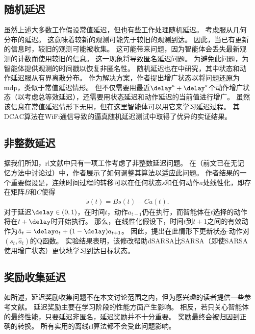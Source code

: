 \subsection{随机延迟}
\label{subsec:stochastic_related}
虽然上述大多数工作假设常值延迟，但也有些工作处理随机延迟。
\cite{agarwal2021blind}考虑服从几何分布的延迟。
这意味着较新的观测可能先于较旧的观测到达。
因此，当已有更新的信息时，较旧的观测可能被收集。
这可能带来问题，因为智能体会丢失最新观测的计数而使用较旧的信息。
这一现象将导致匿名延迟问题。
为避免此问题，\cite{agarwal2021blind}为智能体提供观测的时间戳以恢复非匿名性。
随机延迟也在\cite{bouteiller2020reinforcement}中研究，其中状态和动作延迟服从有界离散分布。
作为解决方案，作者提出增广状态以将问题还原为\gls{mdp}，类似于常值延迟情形。
但不仅需要用最近$\delay^a+\delay^s$个动作增广状态（以考虑总等效延迟），还需要用状态延迟和动作延迟的当前值进行增广。
虽然该信息在常值延迟情形下无用，但在这里智能体可以用它来学习延迟过程。
其DCAC算法在WiFi通信导致的逼真随机延迟测试中取得了优异的实证结果。

\subsection{非整数延迟}
\label{subsec:non_int_related}
据我们所知，\gls{rl}文献中只有一项工作考虑了非整数延迟问题。
在\cite{schuitema2010control}（前文已在无记忆方法中讨论过）中，作者展示了如何调整其算法以适应此问题。
作者结果的一个重要假设是，连续时间过程的转移可以在任何状态$s$和任何动作$a$处线性化，即存在矩阵$B$和$C$使得
\begin{align*}
    \dot{s}(t)=Bs(t) + Ca(t).
\end{align*}
对于延迟$\delay\in(0,1)$，在时间$t$，动作$a_{t-1}$仍在执行，而智能体在$t$选择的动作将在$t+\delay$时开始执行。
那么，在线性化假设下，时间$t$到$t+1$之间的有效动作为$\hat{a}_t = \delay a_t + (1-\delay) a_{t+1}$。
因此，\cite{schuitema2010control}提出在此情形下更新状态-动作对$(s_t,\hat{a}_t)$的Q函数。
实验结果表明，该修改帮助dSARSA比SARSA（即使SARSA使用增广状态）更快地学习到达目标状态。

\subsection{奖励收集延迟}
\label{subsec:reward_delay_related}
如所述，延迟奖励收集问题不在本文讨论范围之内，但为感兴趣的读者提供一些参考文献。
延迟奖励主要在学习阶段的性能方面产生影响。
相反，若只关心智能体的最终性能，只要延迟非匿名，延迟奖励并不十分重要。
奖励最终会被归因到正确的转换。
所有实用的离线\gls{rl}算法都不会受此问题影响。

